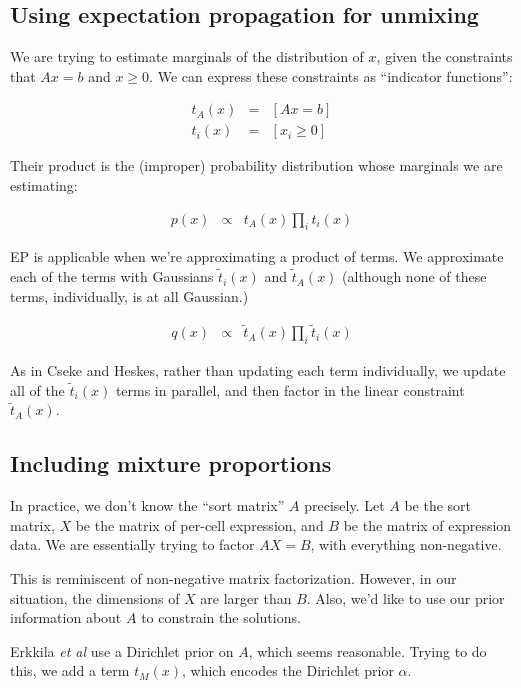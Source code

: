 \documentclass{article}
\begin{document}
\subsection*{Using expectation propagation for unmixing}

We are trying to estimate marginals of the distribution of $x$, given the
constraints that $Ax = b$ and $x \ge 0$. We can express these constraints
as ``indicator functions'':

\begin{eqnarray}
t_A(x) & = & [Ax = b] \\
t_i(x) & = & [x_i \ge 0]
\end{eqnarray}

Their product is the (improper) probability distribution whose marginals
we are estimating:

\begin{eqnarray}
p(x) & \propto & t_A(x) \prod_i t_i(x)
\end{eqnarray}

EP is applicable when we're approximating a product of terms. We approximate each of the terms with
Gaussians
$\tilde{t}_i(x)$ and $\tilde{t}_A(x)$ (although none of these
terms, individually, is at all Gaussian.) 

\begin{eqnarray}
q(x) & \propto & \tilde{t}_A(x) \prod_i \tilde{t}_i(x)
\end{eqnarray}

As in Cseke and Heskes, rather than updating each term individually,
we update all of the $\tilde{t}_i(x)$ terms in parallel, and then factor in
the linear constraint $\tilde{t}_A(x)$.

\subsection*{Including mixture proportions}

In practice, we don't know the ``sort matrix'' $A$ precisely.
Let $A$ be the sort matrix, $X$ be the matrix of per-cell expression, and
$B$ be the matrix of expression data. We are essentially trying to factor
$AX=B$, with everything non-negative.

This is reminiscent of non-negative matrix factorization. However, in our situation,
the dimensions of $X$ are larger than $B$. Also, we'd like to use our
prior information about $A$ to constrain the solutions.

Erkkila {\em et al} use a Dirichlet prior on $A$, which seems reasonable. Trying to do
this, we add a term $t_M(x)$, which encodes the Dirichlet prior $\alpha$.
\end{document}
